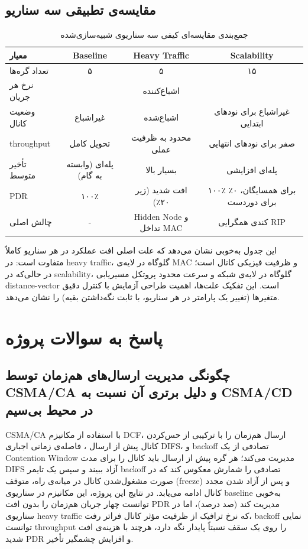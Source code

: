 \documentclass{article}
\begin{document}
	\subsection{مقایسه‌ی تطبیقی سه سناریو}
	
	\begin{table}[H]
		\centering
		\caption{جمع‌بندی مقایسه‌ای کیفی سه سناریوی شبیه‌سازی‌شده}
		\begin{tabular}{lccc}
			\toprule
			معیار & Baseline & Heavy Traffic & Scalability \\
			\midrule
			تعداد گره‌ها & ۵ & ۵ & ۱۵ \\
			نرخ هر جریان & \lr{500kbps} & اشباع‌کننده & \lr{500kbps} \\
			وضعیت کانال & غیراشباع & اشباع‌شده & غیراشباع برای نودهای ابتدایی \\
			throughput & تحویل کامل & محدود به ظرفیت عملی & صفر برای نودهای انتهایی \\
			تأخیر متوسط & پله‌ای (وابسته به گام) & بسیار بالا & پله‌ای افزایشی \\
			PDR & ۱۰۰٪ & افت شدید (زیر ۲۰٪) & ۱۰۰٪ برای همسایگان، ۰٪ برای دوردست \\
			چالش اصلی & - & Hidden Node و تداخل MAC & کندی همگرایی RIP \\
			\bottomrule
		\end{tabular}
	\end{table}
	
	این جدول به‌خوبی نشان می‌دهد که علت اصلی افت عملکرد در هر سناریو کاملاً متفاوت است: در heavy traffic، گلوگاه در لایه‌ی MAC و ظرفیت فیزیکی کانال است؛ در حالی‌که در scalability، گلوگاه در لایه‌ی شبکه و سرعت محدود پروتکل مسیریابی distance-vector است. این تفکیک علت‌ها، اهمیت طراحی آزمایش با کنترل دقیق متغیرها (تغییر یک پارامتر در هر سناریو، با ثابت نگه‌داشتن بقیه) را نشان می‌دهد.
	

	\section{پاسخ به سوالات پروژه}
	
	\subsection{چگونگی مدیریت ارسال‌های هم‌زمان توسط CSMA/CA و دلیل برتری آن نسبت به CSMA/CD در محیط بی‌سیم}
	
	CSMA/CA با استفاده از مکانیزم DCF، ارسال هم‌زمان را با ترکیبی از حس‌کردن کانال پیش از ارسال 
	\lr{(Carrier Sense)}
	، فاصله‌ی زمانی اجباری DIFS، و backoff تصادفی از یک Contention Window مدیریت می‌کند؛ هر گره پیش از ارسال باید کانال را برای مدت DIFS آزاد ببیند و سپس یک تایمر backoff تصادفی را شمارش معکوس کند که در صورت مشغول‌شدن کانال در میانه‌ی راه، متوقف (freeze) و پس از آزاد شدن مجدد کانال ادامه می‌یابد. در نتایج این پروژه، این مکانیزم در سناریوی baseline به‌خوبی توانست چهار جریان هم‌زمان را بدون افت PDR مدیریت کند (صد درصد)، اما در سناریوی heavy traffic که نرخ ترافیک از ظرفیت مؤثر کانال فراتر رفت، backoff نمایی توانست throughput را روی یک سقف نسبتاً پایدار نگه دارد، هرچند با هزینه‌ی افت شدید PDR و افزایش چشمگیر تأخیر.
	
\end{document}
